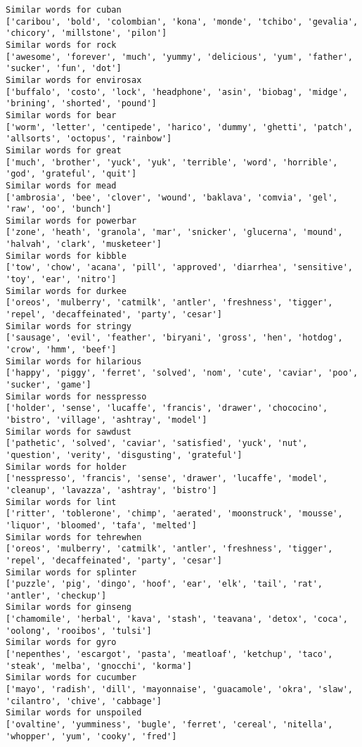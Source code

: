 \documentclass[11pt]{article}
\begin{document}
\begin{Verbatim}[commandchars=\\\{\}]
Similar words for cuban
['caribou', 'bold', 'colombian', 'kona', 'monde', 'tchibo', 'gevalia', 'chicory', 'millstone', 'pilon']
Similar words for rock
['awesome', 'forever', 'much', 'yummy', 'delicious', 'yum', 'father', 'sucker', 'fun', 'dot']
Similar words for envirosax
['buffalo', 'costo', 'lock', 'headphone', 'asin', 'biobag', 'midge', 'brining', 'shorted', 'pound']
Similar words for bear
['worm', 'letter', 'centipede', 'harico', 'dummy', 'ghetti', 'patch', 'allsorts', 'octopus', 'rainbow']
Similar words for great
['much', 'brother', 'yuck', 'yuk', 'terrible', 'word', 'horrible', 'god', 'grateful', 'quit']
Similar words for mead
['ambrosia', 'bee', 'clover', 'wound', 'baklava', 'comvia', 'gel', 'raw', 'oo', 'bunch']
Similar words for powerbar
['zone', 'heath', 'granola', 'mar', 'snicker', 'glucerna', 'mound', 'halvah', 'clark', 'musketeer']
Similar words for kibble
['tow', 'chow', 'acana', 'pill', 'approved', 'diarrhea', 'sensitive', 'toy', 'ear', 'nitro']
Similar words for durkee
['oreos', 'mulberry', 'catmilk', 'antler', 'freshness', 'tigger', 'repel', 'decaffeinated', 'party', 'cesar']
Similar words for stringy
['sausage', 'evil', 'feather', 'biryani', 'gross', 'hen', 'hotdog', 'crow', 'hmm', 'beef']
Similar words for hilarious
['happy', 'piggy', 'ferret', 'solved', 'nom', 'cute', 'caviar', 'poo', 'sucker', 'game']
Similar words for nesspresso
['holder', 'sense', 'lucaffe', 'francis', 'drawer', 'chococino', 'bistro', 'village', 'ashtray', 'model']
Similar words for sawdust
['pathetic', 'solved', 'caviar', 'satisfied', 'yuck', 'nut', 'question', 'verity', 'disgusting', 'grateful']
Similar words for holder
['nesspresso', 'francis', 'sense', 'drawer', 'lucaffe', 'model', 'cleanup', 'lavazza', 'ashtray', 'bistro']
Similar words for lint
['ritter', 'toblerone', 'chimp', 'aerated', 'moonstruck', 'mousse', 'liquor', 'bloomed', 'tafa', 'melted']
Similar words for tehrewhen
['oreos', 'mulberry', 'catmilk', 'antler', 'freshness', 'tigger', 'repel', 'decaffeinated', 'party', 'cesar']
Similar words for splinter
['puzzle', 'pig', 'dingo', 'hoof', 'ear', 'elk', 'tail', 'rat', 'antler', 'checkup']
Similar words for ginseng
['chamomile', 'herbal', 'kava', 'stash', 'teavana', 'detox', 'coca', 'oolong', 'rooibos', 'tulsi']
Similar words for gyro
['nepenthes', 'escargot', 'pasta', 'meatloaf', 'ketchup', 'taco', 'steak', 'melba', 'gnocchi', 'korma']
Similar words for cucumber
['mayo', 'radish', 'dill', 'mayonnaise', 'guacamole', 'okra', 'slaw', 'cilantro', 'chive', 'cabbage']
Similar words for unspoiled
['ovaltine', 'yumminess', 'bugle', 'ferret', 'cereal', 'nitella', 'whopper', 'yum', 'cooky', 'fred']

\end{Verbatim}
\end{document}
